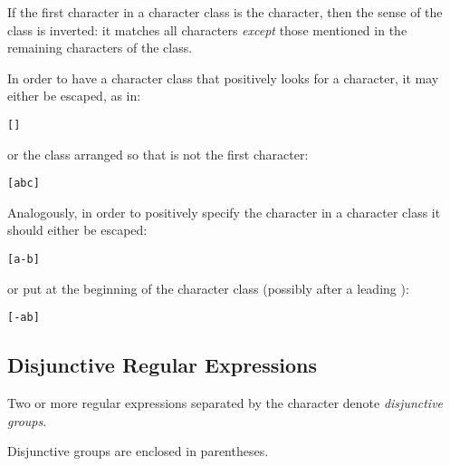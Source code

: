 \begin{table}[htbp]
\end{table}
If the first character in a character class is the \q{\uphat} character, then the sense of the class is inverted: it matches all characters \emph{except} those mentioned in the remaining characters of the class.
\begin{aside}
In order to have a character class that positively looks for a \q{\uphat} character, it may either be escaped, as in:
\begin{alltt}
[\bsl\upht]
\end{alltt}
or the class arranged so that \q{\uphat} is not the first character:
\begin{alltt}
[ab\uphat{}c]
\end{alltt}

Analogously, in order to positively specify the \q{-} character in a character class it should either be escaped:
\begin{alltt}
[a\bsl{}-b]
\end{alltt}
or put at the beginning of the character class (possibly after a leading \q{\uphat}):
\begin{alltt}
[-ab]
\end{alltt}
\end{aside}

\subsection{Disjunctive Regular Expressions}
\label{disjunctiveRegexp}
Two or more regular expressions separated by the \q{|} character denote \emph{disjunctive groups}. 

Disjunctive groups are enclosed in parentheses.

